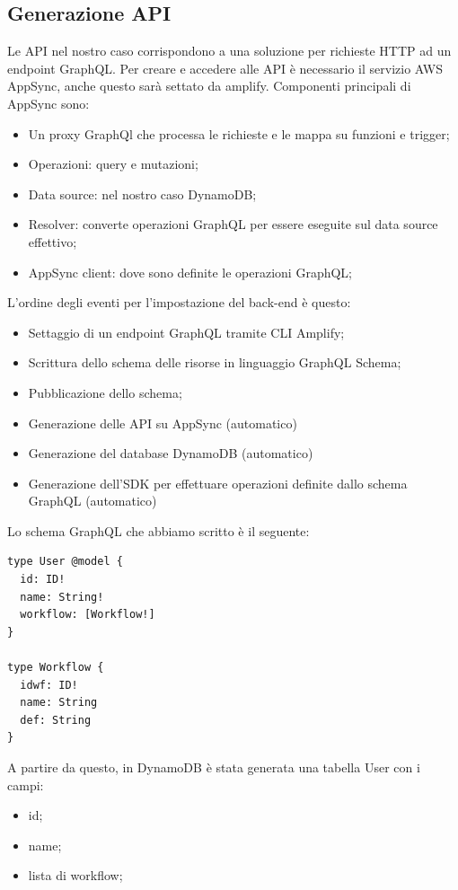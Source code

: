 \subsection{Generazione API}
Le API nel nostro caso corrispondono a una soluzione per richieste HTTP ad un endpoint GraphQL.
Per creare e accedere alle API è necessario il servizio AWS AppSync, anche questo sarà settato da amplify.
Componenti principali di AppSync sono:
\begin{itemize}
\item Un proxy GraphQl che processa le richieste e le mappa su funzioni e trigger;
\item Operazioni: query e mutazioni;
\item Data source: nel nostro caso DynamoDB;
\item Resolver: converte operazioni GraphQL per essere eseguite sul data source effettivo;
\item AppSync client: dove sono definite le operazioni GraphQL;
\end{itemize}
L'ordine degli eventi per l'impostazione del back-end è questo:

\begin{itemize}
\item Settaggio di un endpoint GraphQL tramite CLI Amplify;
\item Scrittura dello schema delle risorse in linguaggio GraphQL Schema;
\item Pubblicazione dello schema;
\item Generazione delle API su AppSync (automatico)
\item Generazione del database DynamoDB (automatico)
\item Generazione dell'SDK per effettuare operazioni definite dallo schema GraphQL (automatico)
\end{itemize}

Lo schema GraphQL che abbiamo scritto è il seguente:
\begin{verbatim}
type User @model {
  id: ID!
  name: String!
  workflow: [Workflow!]
}

type Workflow {
  idwf: ID!
  name: String
  def: String
}
\end{verbatim}


A partire da questo, in DynamoDB è stata generata una tabella User con i campi:
\begin{itemize}
\item id;
\item name;
\item lista di workflow;
\end{itemize}

